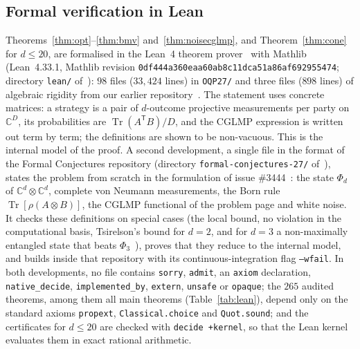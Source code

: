 \documentclass[11pt]{article}
\theoremstyle{remark}
\numberwithin{equation}{section}
\newcommand{\C}{\mathbb{C}}
\newcommand{\Tr}{\operatorname{Tr}}
\begin{document}
\subsection{Formal verification in Lean}\label{subsec:lean}
Theorems~\ref{thm:opt}--\ref{thm:bmv} and~\ref{thm:noisecglmp}, and Theorem~\ref{thm:cone} for $d\le20$, are formalised
in the Lean~4 theorem prover~\cite{Lean} with Mathlib~\cite{Mathlib} (Lean~4.33.1, Mathlib revision
\texttt{0df444a360eaa60ab8c11dca51a86af692955474}; directory \texttt{lean/} of~\cite{repo}): $98$ files ($33{,}424$ lines)
in \texttt{OQP27/} and three files ($898$ lines) of algebraic rigidity from our earlier repository~\cite{repoCGLMP}. The
statement uses concrete matrices: a strategy is a pair of $d$-outcome projective measurements per party on $\C^D$, its
probabilities are $\Tr(A^{\mathsf T}B)/D$, and the CGLMP expression is written out term by term; the definitions are
shown to be non-vacuous. This is the internal model of the proof. A second development, a single file in the format of
the Formal Conjectures repository (directory \texttt{formal-conjectures-27/} of~\cite{repo}), states the problem from
scratch in the formulation of issue \#3444~\cite{FC3444}: the state $\Phi_d$ of $\C^d\otimes\C^d$, complete von Neumann
measurements, the Born rule $\Tr[\rho(A\otimes B)]$, the CGLMP functional of the problem page and white noise. It checks
these definitions on special cases (the local bound, no violation in the computational basis, Tsirelson's bound for
$d=2$, and for $d=3$ a non-maximally entangled state that beats $\Phi_3$~\cite{ADGL}), proves that they reduce to the
internal model, and builds inside that repository with its continuous-integration flag \texttt{--wfail}. In both
developments, no file contains \texttt{sorry}, \texttt{admit}, an \texttt{axiom} declaration,
\texttt{native\_decide}, \texttt{implemented\_by}, \texttt{extern}, \texttt{unsafe} or \texttt{opaque}; the $265$
audited theorems, among them all main theorems (Table~\ref{tab:lean}), depend only on the standard axioms
\texttt{propext}, \texttt{Classical.choice} and \texttt{Quot.sound}; and the certificates for $d\le20$ are checked with
\texttt{decide +kernel}, so that the Lean kernel evaluates them in exact rational arithmetic.
\end{document}
